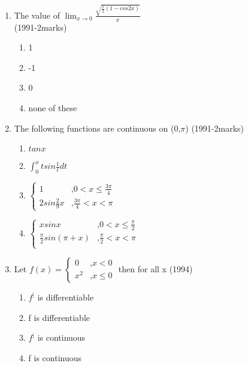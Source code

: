 \documentclass[journal,12pt,twocolumn]{IEEEtran}
\theoremstyle{remark}
\begin{document}
\begin{enumerate}
\item The value of $\lim_{x\to0}{\frac{\sqrt{\frac{1}{2}(1-cos2x)}}{x}}$ \\
\hfill{(1991-2marks)} 
\begin{enumerate}
    \item 1
    \item -1
    \item 0
    \item none of these \\
\end{enumerate}
\item The following functions are continuous on (0,$\pi$) \hfill{(1991-2marks)} 
\begin{enumerate}
    \item $tanx$
    \item $\int_{0}^{x}tsin\frac{1}{t}dt$ 
    \item $\begin{cases} 1 & \text{,} 0<x\leq\frac{3\pi}{4} \\
                2sin\frac{2}{9}x & \text{,} \frac{3\pi}{4}<x<\pi
    
\end{cases}$
    \item $\begin{cases} xsinx & \text{,} 0<x\leq\frac{\pi}{2} \\
                  \frac{\pi}{2}sin(\pi+x) & \text{,} \frac{\pi}{2}<x<\pi \\ 
\end{cases}$
\end{enumerate}
\item Let $f(x)=\begin{cases} 0 & \text{,} x<0 \\
                             x^2 & \text{,} x\leq0
\end{cases}$ then for all x \hfill{(1994)} 

\begin{enumerate}
    \item $f^|$ is differentiable
    \item f is differentiable
    \item $f^|$ is continuous 
    \item f is continuous
\end{enumerate}


\end{enumerate}
\end{document}
